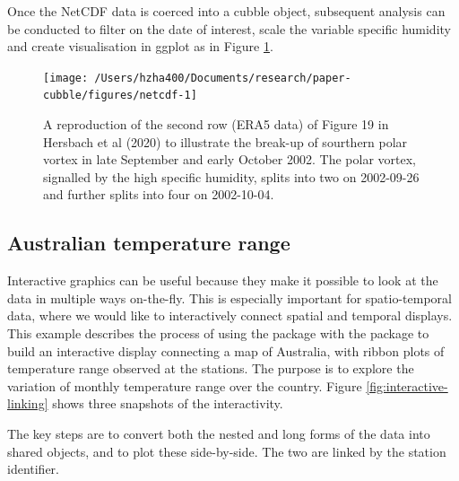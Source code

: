 \documentclass[
  shortnames]{jss}
\begin{document}
Once the NetCDF data is coerced into a cubble object, subsequent analysis can be conducted to filter on the date of interest, scale the variable specific humidity and create visualisation in ggplot as in Figure \ref{fig:netcdf}.

\begin{CodeChunk}
\begin{figure}

{\centering \texttt{[image: /Users/hzha400/Documents/research/paper-cubble/figures/netcdf-1]} 

}

\caption[A reproduction of the second row (ERA5 data) of Figure 19 in Hersbach et al (2020) to illustrate the break-up of sourthern polar vortex in late September and early October 2002]{A reproduction of the second row (ERA5 data) of Figure 19 in Hersbach et al (2020) to illustrate the break-up of sourthern polar vortex in late September and early October 2002. The polar vortex, signalled by the high specific humidity, splits into two on 2002-09-26 and further splits into four on 2002-10-04.}\label{fig:netcdf}
\end{figure}
\end{CodeChunk}

\hypertarget{australian-temperature-range}{%
\subsection{Australian temperature range}\label{australian-temperature-range}}

Interactive graphics can be useful because they make it possible to look at the data in multiple ways on-the-fly. This is especially important for spatio-temporal data, where we would like to interactively connect spatial and temporal displays. This example describes the process of using the  package with the  package to build an interactive display connecting a map of Australia, with ribbon plots of temperature range observed at the stations. The purpose is to explore the variation of monthly temperature range over the country. Figure \ref{fig:interactive-linking} shows three snapshots of the interactivity.

The key steps are to convert both the nested and long forms of the data into shared  objects, and to plot these side-by-side. The two are linked by the station identifier.
\end{document}
